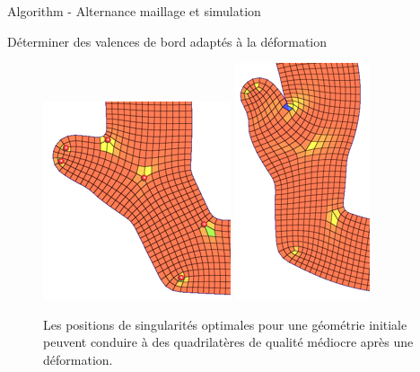 \begin{frame}{Algorithm - Alternance maillage et simulation}
    \small
    \begin{algorithm}[H]
        \SetAlgoLined
        \label{algo:iterative_meshing_quadcover}
    \end{algorithm}
\end{frame}
\begin{frame}{Déterminer des valences de bord adaptés à la déformation}
    \small
    \begin{figure}
        \centering
        \includegraphics[width=0.46\linewidth]{img/quadsimu/coin_pb_0.PNG}
        \includegraphics[width=0.27\linewidth]{img/quadsimu/coin_pb_1.PNG}
        \caption{Les positions de singularités optimales pour une géométrie initiale peuvent conduire à des quadrilatères de qualité médiocre après une déformation.}
        \label{fig:asp_ratio_pb}
    \end{figure}
\end{frame}
